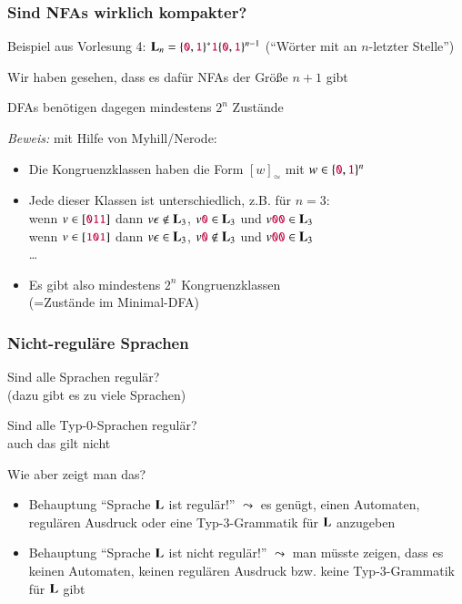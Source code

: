 \documentclass[aspectratio=1610,onlymath]{beamer}
\begin{document}
\begin{frame}\frametitle{Sind NFAs wirklich kompakter?}

Beispiel aus Vorlesung 4:
$\textbf{\textcolor{black}{L}}_n= \{\mathtt{\textcolor{purple}{0}},\mathtt{\textcolor{purple}{1}}\}^* \mathtt{\textcolor{purple}{1}} \{\mathtt{\textcolor{purple}{0}},\mathtt{\textcolor{purple}{1}}\}^{n-1}$
("`Wörter mit  an $n$-letzter Stelle"')
\bigskip

Wir haben gesehen, dass es dafür NFAs der Größe $n+1$ gibt
\bigskip

DFAs benötigen dagegen mindestens $2^n$ Zustände\pause
\bigskip

\emph{Beweis:} mit Hilfe von Myhill/Nerode:
\begin{itemize}
\item Die Kongruenzklassen haben die Form $[w]_\simeq$ mit $w\in\{\mathtt{\textcolor{purple}{0}},\mathtt{\textcolor{purple}{1}}\}^n$
\item Jede dieser Klassen ist unterschiedlich, z.B. für $n=3$:\\
wenn $v\in[\mathtt{\textcolor{purple}{011}}]$ dann $v\epsilon\notin\textbf{\textcolor{black}{L}}_3$, $v\mathtt{\textcolor{purple}{0}}\in\textbf{\textcolor{black}{L}}_3$ und $v\mathtt{\textcolor{purple}{00}}\in\textbf{\textcolor{black}{L}}_3$\\
wenn $v\in[\mathtt{\textcolor{purple}{101}}]$ dann $v\epsilon\in\textbf{\textcolor{black}{L}}_3$, $v\mathtt{\textcolor{purple}{0}}\notin\textbf{\textcolor{black}{L}}_3$ und $v\mathtt{\textcolor{purple}{00}}\in\textbf{\textcolor{black}{L}}_3$\\
\ldots
\item Es gibt also mindestens $2^n$ Kongruenzklassen\\(=Zustände im Minimal-DFA)
\end{itemize}

\end{frame}


\begin{frame}\frametitle{Nicht-reguläre Sprachen}

Sind alle Sprachen regulär?\\\pause
{} (dazu gibt es zu viele Sprachen)\pause
\bigskip

Sind alle Typ-0-Sprachen regulär?\\\pause
{} auch das gilt nicht
\bigskip

\alert{Wie aber zeigt man das?}
\begin{itemize}
\item Behauptung "`Sprache $\textbf{\textcolor{black}{L}}$ ist regulär!"' $\leadsto$ es genügt, \alert{einen} Automaten, regulären Ausdruck oder eine Typ-3-Grammatik für $\textbf{\textcolor{black}{L}}$ anzugeben
\item Behauptung "`Sprache $\textbf{\textcolor{black}{L}}$ ist nicht regulär!"' $\leadsto$ man müsste zeigen, dass es \alert{keinen} Automaten, \alert{keinen} regulären Ausdruck bzw. \alert{keine} Typ-3-Grammatik für $\textbf{\textcolor{black}{L}}$ gibt
\end{itemize}

\end{frame}
\end{document}
